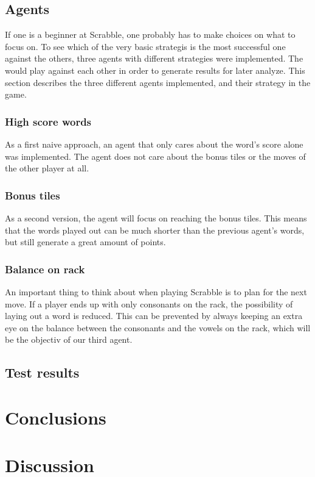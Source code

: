 \documentclass[a4paper, 12pt]{report}
\begin{document}
\section{Agents}
If one is a beginner at Scrabble, one probably has to make choices on what to focus on. To see which of the very basic strategis is the most successful one against the others, three agents with different strategies were implemented. The would play against each other in order to generate results for later analyze. This section describes the three different agents implemented, and their strategy in the game.

\subsection{High score words}
As a first naive approach, an agent that only cares about the word's score alone was implemented. The agent does not care about the bonus tiles or the moves of the other player at all. 

\subsection{Bonus tiles}
As a second version, the agent will focus on reaching the bonus tiles. This means that the words played out can be much shorter than the previous agent's words, but still generate a great amount of points. 

\subsection{Balance on rack}
An important thing to think about when playing Scrabble is to plan for the next move. If a player ends up with only consonants on the rack, the possibility of laying out a word is reduced. This can be prevented by always keeping an extra eye on the balance between the consonants and the vowels on the rack, which will be the objectiv of our third agent.

\section{Test results}
\chapter{Conclusions}
\chapter{Discussion}
\end{document}
